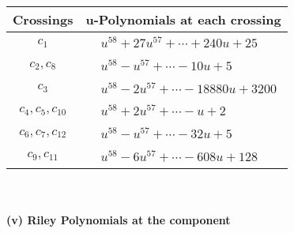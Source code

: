 \documentclass[1p]{elsarticle_modified}
\theoremstyle{definition}
\begin{document}
\begin{tabular}{m{50pt}|m{274pt}}
Crossings & \hspace{64pt}u-Polynomials at each crossing \\
\hline $$\begin{aligned}c_{1}\end{aligned}$$&$\begin{aligned}
&u^{58}+27 u^{57}+\cdots+240 u+25
\end{aligned}$\\
\hline $$\begin{aligned}c_{2},c_{8}\end{aligned}$$&$\begin{aligned}
&u^{58}- u^{57}+\cdots-10 u+5
\end{aligned}$\\
\hline $$\begin{aligned}c_{3}\end{aligned}$$&$\begin{aligned}
&u^{58}-2 u^{57}+\cdots-18880 u+3200
\end{aligned}$\\
\hline $$\begin{aligned}c_{4},c_{5},c_{10}\end{aligned}$$&$\begin{aligned}
&u^{58}+2 u^{57}+\cdots- u+2
\end{aligned}$\\
\hline $$\begin{aligned}c_{6},c_{7},c_{12}\end{aligned}$$&$\begin{aligned}
&u^{58}- u^{57}+\cdots-32 u+5
\end{aligned}$\\
\hline $$\begin{aligned}c_{9},c_{11}\end{aligned}$$&$\begin{aligned}
&u^{58}-6 u^{57}+\cdots-608 u+128
\end{aligned}$\\
\hline
\end{tabular}\\~\\
\newpage\renewcommand{\arraystretch}{1}
\flushleft \textbf{(v) Riley Polynomials at the component}\newline \\
\end{document}
